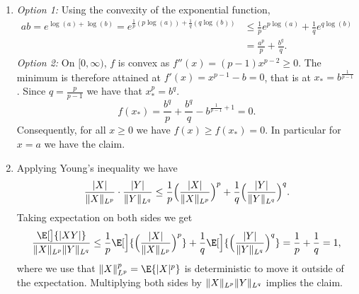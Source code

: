 \begin{solution}
\begin{enumerate}[wide=0pt]
    \item[\ref{it: young inequality}]
    \emph{Option 1:} Using the convexity of the exponential function,
    \[\begin{aligned}
        ab
        = e^{\log(a) + \log(b)}
        = e^{\frac1p (p\log(a)) + \frac1q (q\log(b))}
        &\le \frac1p e^{p\log(a)} + \frac1q e^{q\log(b)}
        \\
        &= \frac{a^p}p + \frac{b^q}q.
    \end{aligned}
    \]
    \emph{Option 2:} On \([0, \infty)\), \(f\) is convex  as \(f''(x) = (p-1)x^{p-2} \ge 0\).
    The minimum is therefore attained at \(f'(x) = x^{p-1} - b = 0\), that is
    at \(x_* = b^{\frac1{p-1}}\). Since \(q= \frac{p}{p-1}\) we have that \(x_*^p = b^q\).
    \[
        f(x_*) = \frac{b^q}p + \frac{b^q}q - b^{\frac{1}{p-1} + 1} = 0.
    \]
    Consequently, for all \(x \ge 0\) we have \(f(x) \ge f(x_*) = 0\).
    In particular for \(x = a\) we have the claim.

    \item[\ref{it: holder's inequality proof}]
    Applying Young's inequality we have
    \[
        \frac{\lvert X\rvert}{\lVert X\rVert_{L^p}} \cdot \frac{\lvert Y\rvert}{\lVert Y\rVert_{L^q}}
        \le \frac1p \Bigl(\frac{\lvert X\rvert}{\lVert X\rVert_{L^p}}\Bigr)^p
        + \frac1q \Bigl(\frac{\lvert Y\rvert}{\lVert Y\rVert_{L^q}}\Bigr)^q.
    \]
    Taking expectation on both sides we get
    \[
        \frac{\E[\big]{\abs{XY}}}{\norm{X}_{L^p} \norm{Y}_{L^q}}
        \le 
            \frac1p \E[\Big]{\Bigl(\frac{\abs{X}}{\norm{X}_{L^p}}\Bigr)^p}
            + \frac1q \E[\Big]{\Bigl(\frac{\abs{Y}}{\norm{Y}_{L^q}}\Bigr)^q}
        = 
            \frac1p + \frac1q
        = 1,
    \]
    where we use that \(\norm{X}_{L^p}^p = \E{\abs{X}^p}\) is
    deterministic to move it outside of the expectation. Multiplying
    both sides by \(\lVert X\rVert_{L^p} \lVert Y\rVert_{L^q}\)
    implies the claim.
    \qedhere
\end{enumerate}
\end{solution}
